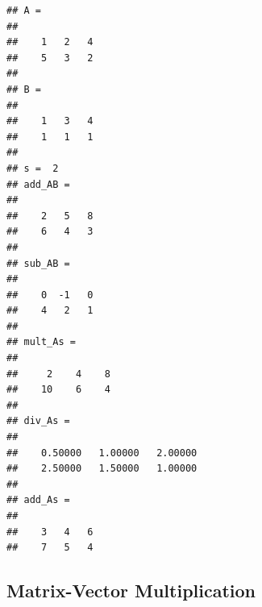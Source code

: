 \documentclass[
]{article}
\newenvironment{Shaded}{\begin{snugshade}}{\end{snugshade}}
\newcommand{\CommentTok}[1]{\textcolor[rgb]{0.56,0.35,0.01}{\textit{#1}}}
\newcommand{\FloatTok}[1]{\textcolor[rgb]{0.00,0.00,0.81}{#1}}
\newcommand{\NormalTok}[1]{#1}
\newcommand{\OperatorTok}[1]{\textcolor[rgb]{0.81,0.36,0.00}{\textbf{#1}}}
\begin{document}
\begin{Shaded}
\end{Shaded}

\begin{verbatim}
## A =
## 
##    1   2   4
##    5   3   2
## 
## B =
## 
##    1   3   4
##    1   1   1
## 
## s =  2
## add_AB =
## 
##    2   5   8
##    6   4   3
## 
## sub_AB =
## 
##    0  -1   0
##    4   2   1
## 
## mult_As =
## 
##     2    4    8
##    10    6    4
## 
## div_As =
## 
##    0.50000   1.00000   2.00000
##    2.50000   1.50000   1.00000
## 
## add_As =
## 
##    3   4   6
##    7   5   4
\end{verbatim}

\hypertarget{matrix-vector-multiplication}{%
\subsection{Matrix-Vector
Multiplication}\label{matrix-vector-multiplication}}
\end{document}
